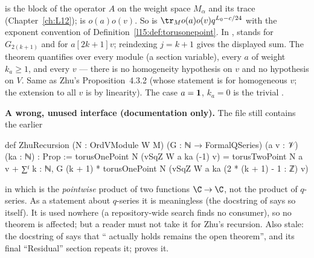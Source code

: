 \begin{dictionary}
 is the block of the operator $A$ on the weight space $M_\alpha$ and  its
trace (Chapter~\ref{ch:L12});  is $o(a)o(v)$. So  is
$\tr_M o(a)o(v)q^{L_0-c/24}$ with the exponent convention of Definition~\ref{l15:def:torusonepoint}. In
,  stands for $G_{2(k+1)}$ and  for
$a[2k+1]v$; reindexing $j=k+1$ gives the displayed sum. The theorem quantifies over every module  (a section
variable), every $a$ of weight $k_a\ge1$, and every $v$ --- there is no homogeneity hypothesis on $v$ and no hypothesis
on $V$. Same as Zhu's Proposition~4.3.2 (whose statement is for homogeneous $v$; the extension to all $v$ is by
linearity). The case $a=\mathbf{1}$, $k_a=0$ is the trivial \allowbreak{}.
\end{dictionary}

\begin{warning}
\textbf{A wrong, unused interface (documentation only).} The file 
still contains the earlier
\begin{leancode}
def ZhuRecursion (N : OrdVModule W M) (G : ℕ → FormalQSeries) (a v : 𝒱) (ka : ℕ) : Prop :=
  torusOnePoint N (vSqZ W a ka (-1) v)
    = torusTwoPoint N a v
      + ∑ᶠ k : ℕ, G (k + 1) * torusOnePoint N (vSqZ W a ka (2 * (k + 1) - 1 : ℤ) v)
\end{leancode}
in which  is the \emph{pointwise} product of two functions $\C\to\C$, not the product of
$q$-series. As a statement about $q$-series it is meaningless (the docstring of  says so itself). It is used
nowhere (a repository-wide search finds no consumer), so no theorem is affected; but a reader must not take it for
Zhu's recursion. Also stale: the docstring of  says that ``
actually holds remains the open theorem'', and its final ``Residual'' section repeats it; 
proves it.
\end{warning}

